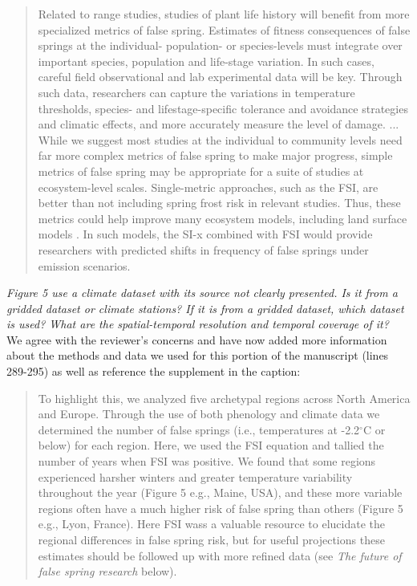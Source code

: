 \documentclass[11pt,a4paper]{article}
\begin{document}
\begin{quotation}
Related to range studies, studies of plant life history will benefit from more specialized metrics of false spring. Estimates of fitness consequences of false springs at the individual- population- or species-levels must integrate over important species, population and life-stage variation. In such cases, careful field observational and lab experimental data will be key. Through such data, researchers can capture the variations in temperature thresholds, species- and lifestage-specific tolerance and avoidance strategies and climatic effects, and more accurately measure the level of damage.  
...
While we suggest most studies at the individual to community levels need far more complex metrics of false spring to make major progress, simple metrics of false spring may be appropriate for a suite of studies at ecosystem-level scales. Single-metric approaches, such as the FSI, are better than not including spring frost risk in relevant studies. Thus, these metrics could help improve many ecosystem models, including land surface models \citep{Foley1998, Moorcroft2001, Prentice1992}. In such models, the SI-x combined with FSI would provide researchers with predicted shifts in frequency of false springs under emission scenarios.
\end{quotation}

\textit{Figure 5 use a climate dataset with its source not clearly presented. Is it from a gridded dataset or climate stations? If it is from a gridded dataset, which dataset is used? What are the spatial-temporal resolution and temporal coverage of it?} \\

We agree with the reviewer's concerns and have now added more information about the methods and data we used for this portion of the manuscript (lines 289-295) as well as reference the supplement in the caption: \\

\begin{quotation}
To highlight this, we analyzed five archetypal regions across North America and Europe. Through the use of both phenology \citep{Soudani2012, Schaber2005, USA-NPN2016,  White2009} and climate data \citep[from the NOAA Climate Data Online tool][]{NOAA} we determined the number of false springs (i.e., temperatures at -2.2$^{\circ}$C or below) for each region. Here, we used the FSI equation and tallied the number of years when FSI was positive. We found that some regions experienced harsher winters and greater temperature variability throughout the year (Figure 5 e.g., Maine, USA), and these more variable regions often have a much higher risk of false spring than others (Figure 5 e.g., Lyon, France). Here FSI wass a valuable resource to elucidate the regional differences in false spring risk, but for useful projections these estimates should be followed up with more refined data (see \textit{The future of false spring research} below). 
\end{quotation} 
\end{document}
